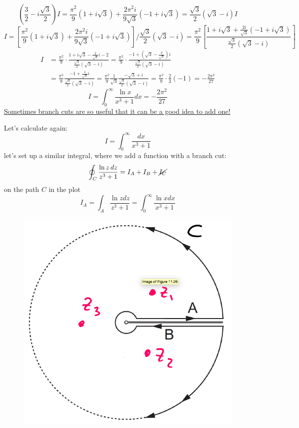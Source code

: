 \documentclass{article}
\begin{document}
\begin{equation}
    \left( \frac{3}{2} - i\frac{\sqrt{3}}{2} \right) I
= \frac{\pi^2}{9} \left( 1 + i\sqrt{3} \right)
+ \frac{2\pi^2 i}{9\sqrt{3}} \left( -1 + i\sqrt{3} \right)
= \frac{\sqrt{3}}{2} (\sqrt{3} - i) I
\end{equation}
\begin{equation}
    I = \left[ \frac{\pi^2}{9} (1 + i\sqrt{3}) + \frac{2\pi^2 i}{9\sqrt{3}} (-1 + i\sqrt{3}) \right] /  \frac{\sqrt{3}}{2}(\sqrt{3}-i) = \frac{\pi^2}{9}
\left[
\frac{1 + i\sqrt{3} + \frac{2 i}{\sqrt{3}} (-1 + i\sqrt{3})}
{\frac{\sqrt{3}}{2} (\sqrt{3} - i)}
\right]
\end{equation}
\newpage
\begin{align}
        I &= \frac{\pi^2}{9} \cdot \frac{1 + i\sqrt{3} - \frac{2}{\sqrt{3}} i - 2}{\frac{\sqrt{3}}{2} (\sqrt{3} - i)}
= \frac{\pi^2}{9} \cdot \frac{-1 + \left(\sqrt{3} - \frac{2}{\sqrt{3}} \right) i}{\frac{\sqrt{3}}{2} (\sqrt{3} - i)}\\
&= \frac{\pi^2}{9} \frac{-1 + \frac{1}{\sqrt{3}}i}{\frac{\sqrt{3}}{2}(\sqrt{3} - i)} = \frac{\pi^2}{9} \frac{1}{\sqrt{3}} \frac{-\sqrt{3}+i}{\frac{\sqrt{3}}{2} (\sqrt{3} - i)} = \frac{\pi^2}{9} \cdot \frac23 (-1) = -\frac{2\pi^2}{27}
\end{align}
\begin{equation}
    I = \int_0^\infty \frac{\ln{x}}{x^3 + 1}dx = -\frac{2\pi^2}{27}
\end{equation}
\underline{Sometimes branch cuts are so useful that it can be a good idea to add one!}

\noindent
Let's calculate again:
\begin{equation}
    I = \int_0^\infty \frac{dx}{x^3 + 1}
\end{equation}
let’s set up a similar integral, where we add a function with a branch cut:
\begin{equation}
    \oint_C \frac{\ln z \, dz}{z^3 + 1} = I_A + I_B + \cancel{I_C}
\end{equation}
on the path $C$ in the plot
\begin{equation}
    I_A = \int_A \frac{\ln{z}dz}{z^3 + 1} = \int_0^\infty \frac{\ln{x}dx}{x^3+1}
\end{equation}
\begin{figure}[h]
    \centering
    \includegraphics[width=0.35\linewidth]{fig45.png}
\end{figure}
\end{document}
